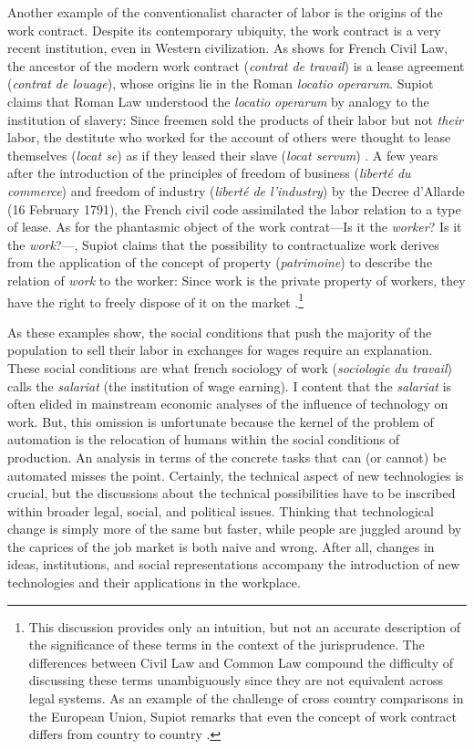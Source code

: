 \documentclass[version=last,draft=false,paper=A4,portrait,twoside=true,twocolumn=false,headinclude=false,footinclude=false,fontsize=12,BCOR=20mm,DIV=calc,pagesize=auto,titlepage=firstiscover,mpinclude=false,open=right,chapterprefix=true,numbers=autoendperiod,headsepline=false,headings=twolinechapter,parskip=false]{scrbook}
\begin{document}
Another example of the conventionalist character of labor is the origins of
the work contract. Despite its contemporary ubiquity, the work contract is
a very recent institution, even in Western civilization. As
\textcite{supiot2004_2016} shows for French Civil Law, the ancestor of the
modern work contract (\emph{contrat de travail}) is a lease agreement (\emph{contrat de
louage}), whose origins lie in the Roman \emph{locatio operarum}. Supiot claims
that Roman Law understood the \emph{locatio operarum} by analogy to the
institution of slavery: Since freemen sold the products of their labor but
not \emph{their} labor, the destitute who worked for the account of others were
thought to lease themselves (\emph{locat se}) as if they leased their slave (\emph{locat
servum}) \autocite[8]{supiot2004_2016}. A few years after the introduction
of the principles of freedom of business (\emph{liberté du commerce}) and freedom
of industry (\emph{liberté de l'industry}) by the Decree d'Allarde (16 February
1791), the French civil code assimilated the labor relation to a type of
lease. As for the phantasmic object of the work contrat---Is it the \emph{worker}?
Is it the \emph{work}?---, Supiot claims that the possibility to contractualize
work derives from the application of the concept of property (\emph{patrimoine})
to describe the relation of \emph{work} to the worker: Since work is the private
property of workers, they have the right to freely dispose of it on the
market \autocite[45--66]{supiot1994_2011}.\footnote{This discussion provides only an intuition, but not an accurate
description of the significance of these terms in the context of the
jurisprudence. The differences between Civil Law and Common Law compound
the difficulty of discussing these terms unambiguously since they are not
equivalent across legal systems. As an example of the challenge of cross
country comparisons in the European Union, Supiot remarks that even the
concept of work contract differs from country to country
\autocite{supiot_et_al1999_2016}.}

As these examples show, the social conditions that push the majority of the
population to sell their labor in exchanges for wages require an
explanation. These social conditions are what french sociology of work
(\emph{sociologie du travail}) calls the \emph{salariat} (the institution of wage
earning). I content that the \emph{salariat} is often elided in mainstream
economic analyses of the influence of technology on work. But, this
omission is unfortunate because the kernel of the problem of automation is
the relocation of humans within the social conditions of production. An
analysis in terms of the concrete tasks that can (or cannot) be automated
misses the point. Certainly, the technical aspect of new technologies is
crucial, but the discussions about the technical possibilities have to be
inscribed within broader legal, social, and political issues. Thinking that
technological change is simply more of the same but faster, while people
are juggled around by the caprices of the job market is both naive and
wrong. After all, changes in ideas, institutions, and social
representations accompany the introduction of new technologies and their
applications in the workplace.
\end{document}
